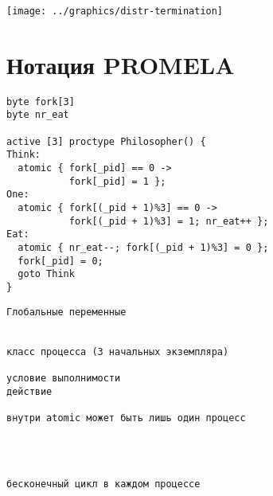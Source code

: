 \documentclass[12pt]{article}
\begin{document}
\begin{center}
  \texttt{[image: ../graphics/distr-termination]}
\end{center}

\section{Нотация PROMELA}
\label{sec:promela-notation}


\begin{minipage}[t]{.53\textwidth}
\scriptsize
\begin{verbatim}
byte fork[3]
byte nr_eat

active [3] proctype Philosopher() { 
Think:
  atomic { fork[_pid] == 0 -> 
           fork[_pid] = 1 };
One:
  atomic { fork[(_pid + 1)%3] == 0 -> 
           fork[(_pid + 1)%3] = 1; nr_eat++ };
Eat:
  atomic { nr_eat--; fork[(_pid + 1)%3] = 0 };
  fork[_pid] = 0;
  goto Think
}
\end{verbatim}
\normalsize
\end{minipage}
%
\begin{minipage}[t]{.47\textwidth}
\scriptsize
\begin{verbatim}
Глобальные переменные


класс процесса (3 начальных экземпляра)

условие выполнимости
действие

внутри atomic может быть лишь один процесс




бесконечный цикл в каждом процессе

\end{verbatim}
\normalsize
\end{minipage}




\end{document}
